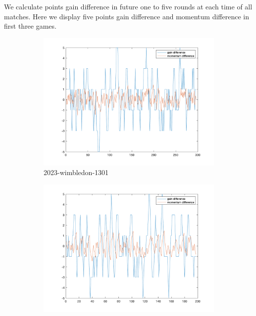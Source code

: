 We calculate points gain difference in future one to five rounds at each time of all matches.
Here we display five points gain difference and momentum difference in first three games.

\begin{figure}[H]
    \centering
    \begin{subfigure}[b]{0.34\textwidth}
        \includegraphics[width=\linewidth]{mainmatter/imgs/diff_match1.png}
        \caption{2023-wimbledon-1301}
    \end{subfigure}\hspace{-0.02\textwidth}
    \begin{subfigure}[b]{0.34\textwidth}
        \includegraphics[width=\linewidth]{mainmatter/imgs/diff_match2.png}

\end{subfigure}
\end{figure}
